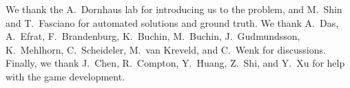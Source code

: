 \documentclass[runningheads]{llncs}
\begin{document}
\medskip{}
We thank the A.~Dornhaus lab for introducing us to the
problem, and M.~Shin and T.~Fasciano for automated solutions and ground truth. We thank A.~Das, A.~Efrat, F.~Brandenburg, K.~Buchin, M.~Buchin, J.~Gudmundsson, K.~Mehlhorn, C.~Scheideler, M.~van
Kreveld, and C.~Wenk for discussions.
Finally, we thank J.~Chen, R.~Compton, Y.~Huang, Z.~Shi, and
Y.~Xu for help with the game development.




\end{document}
